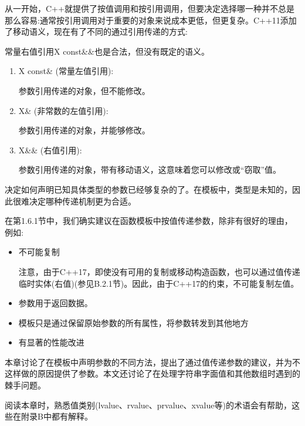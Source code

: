 从一开始，C++就提供了按值调用和按引用调用，但要决定选择哪一种并不总是那么容易:通常按引用调用对于重要的对象来说成本更低，但更复杂。C++11添加了移动语义，现在有了不同的通过引用传递的方式:

\begin{tcolorbox}[colback=webgreen!5!white,colframe=webgreen!75!black]
\hspace*{0.75cm}常量右值引用X const\&\&也是合法，但没有既定的语义。
\end{tcolorbox}

\begin{enumerate}
\item 
X const\& (常量左值引用):

参数引用传递的对象，但不能修改。

\item 
X\& (非常数的左值引用):

参数引用传递的对象，并能够修改。

\item 
X\&\& (右值引用):

参数引用传递的对象，带有移动语义，这意味着您可以修改或“窃取”值。
\end{enumerate}

决定如何声明已知具体类型的参数已经够复杂的了。在模板中，类型是未知的，因此很难决定哪种传递机制更为合适。

在第1.6.1节中，我们确实建议在函数模板中按值传递参数，除非有很好的理由，例如:

\begin{itemize}
\item 
不可能复制

\begin{tcolorbox}[colback=webgreen!5!white,colframe=webgreen!75!black]
\hspace*{0.75cm}注意，由于C++17，即使没有可用的复制或移动构造函数，也可以通过值传递临时实体(右值)(参见B.2.1节)。因此，由于C++17的约束，不可能复制左值。
\end{tcolorbox}

\item 
参数用于返回数据。

\item 
模板只是通过保留原始参数的所有属性，将参数转发到其他地方

\item 
有显著的性能改进
\end{itemize}

本章讨论了在模板中声明参数的不同方法，提出了通过值传递参数的建议，并为不这样做的原因提供了参数。本文还讨论了在处理字符串字面值和其他数组时遇到的棘手问题。

阅读本章时，熟悉值类别(lvalue、rvalue、prvalue、xvalue等)的术语会有帮助，这些在附录B中都有解释。





























